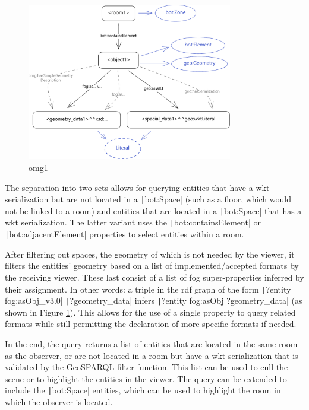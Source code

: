 \begin{figure}[H]
    \begin{adjustwidth}{-0.8cm}{-0.8cm}
        \centering
        \includegraphics[width=0.8\textwidth]{figures/pdf/omg1.pdf}
        \caption{omg1}
        \label{fig:omg1}
    \end{adjustwidth}
\end{figure}


The separation into two sets allows for querying entities that have a \ac{wkt} serialization but are not located in a \texttt|bot:Space| (such as a floor, which would not be linked to a room) and entities that are located in a \texttt|bot:Space| that has a \ac{wkt} serialization. The latter variant uses the \texttt|bot:containsElement| or \texttt|bot:adjacentElement| properties to select entities within a room.

After filtering out spaces, the geometry of which is not needed by the viewer, it filters the entities' geometry based on a list of implemented/accepted formats by the receiving viewer. These last consist of a list of \ac{fog} super-properties inferred by their assignment. In other words: a triple in the \ac{rdf} graph of the form \texttt|?entity fog:asObj_v3.0| \texttt|?geometry_data| infers \texttt|?entity fog:asObj ?geometry_data| (as shown in Figure \ref{fig:omg1}). This allows for the use of a single property to query related formats while still permitting the declaration of more specific formats if needed.

In the end, the query returns a list of entities that are located in the same room as the observer, or are not located in a room but have a \ac{wkt} serialization that is validated by the GeoSPARQL filter function. This list can be used to cull the scene or to highlight the entities in the viewer. The query can be extended to include the \texttt|bot:Space| entities, which can be used to highlight the room in which the observer is located.

